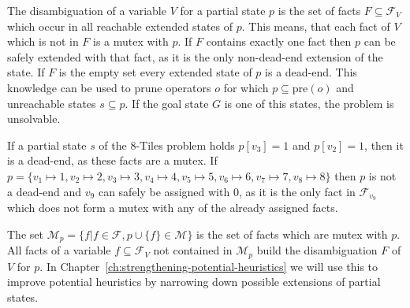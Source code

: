 The disambiguation of a variable $V$ for a partial state $p$ is the set of facts $F\subseteq\mathcal{F}_V$ which occur in all reachable extended states of $p$.
This means, that each fact of $V$ which is not in $F$ is a mutex with $p$.
If $F$ contains exactly one fact then $p$ can be safely extended with that fact, as it is the only non-dead-end extension of the state.
If $F$ is the empty set every extended state of $p$ is a dead-end.
This knowledge can be used to prune operators $o$ for which $p\subseteq\text{pre}(o)$ and unreachable states $s\subseteq p$.
If the goal state $G$ is one of this states, the problem is unsolvable.

If a partial state $s$ of the 8-Tiles problem holds $p[v_3] = 1$ and $p[v_2] = 1$, then it is a dead-end, as these facts are a mutex.
If $p = \{v_1\mapsto1, v_2\mapsto2, v_3\mapsto3, v_4\mapsto4, v_5\mapsto5, v_6\mapsto6, v_7\mapsto7, v_8\mapsto8\}$ then $p$ is not a dead-end and $v_9$ can safely be assigned with $0$, as it is the only fact in $\mathcal{F}_{v_9}$ which does not form a mutex with any of the already assigned facts.

The set $\mathcal{M}_p=\{f|f\in\mathcal{F}, p\cup\{f\}\in\mathcal{M}\}$ is the set of facts which are mutex with $p$.
All facts of a variable $f\subseteq\mathcal{F}_V$ not contained in $\mathcal{M}_p$ build the disambiguation $F$ of $V$ for $p$.
In Chapter~\ref{ch:strengthening-potential-heuristics} we will use this to improve potential heuristics by narrowing down possible extensions of partial states.


